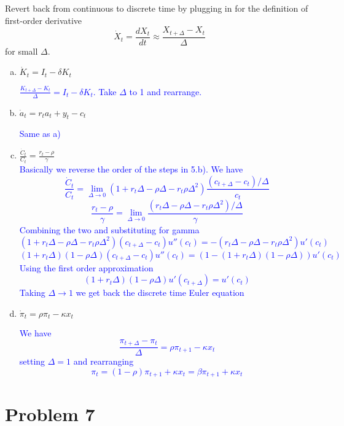 \documentclass[11pt]{extarticle}
\theoremstyle{plain}
\theoremstyle{definition}
\begin{document}
Revert back from continuous to discrete time by plugging in for the definition of first-order derivative
\begin{equation*}
	\dot X_t = \frac{dX_t}{dt} \approx \frac{X_{t+\Delta} - X_t}{\Delta}
\end{equation*}
for small $\Delta$. 

\begin{enumerate}[(a)]
\item $\dot K_t = I_t - \delta K_t$

\textcolor{blue}{$\frac{K_{t+\Delta}-K_t}{\Delta}=I_t-\delta K_t$. Take $\Delta$ to 1 and rearrange.}


\item $\dot a_t = r_t a_t + y_t - c_t$

\textcolor{blue}{Same as a)}

\item $\frac{\dot C_t}{C_t} = \frac{r_t - \rho}{\gamma}$ \\

\textcolor{blue}{Basically we reverse the order of the steps in 5.b). We have $$ \frac{\dot C_t}{C_t} = \lim_{\Delta \rightarrow 0} (1+r_t \Delta-\rho \Delta - r_t \rho \Delta^2) \frac{(c_{t+\Delta}-c_t)/\Delta}{c_t} $$ $$ \frac{r_t - \rho}{\gamma}  =  \lim_{\Delta \rightarrow 0}  \frac{(r_t \Delta-\rho \Delta - r_t \rho \Delta^2)/\Delta}{\gamma} $$ Combining the two and substituting for gamma $$ (1+r_t \Delta-\rho \Delta - r_t \rho \Delta^2) (c_{t+\Delta}-c_t)u''(c_{t}) = - (r_t \Delta-\rho \Delta - r_t \rho \Delta^2) u'(c_t)$$ $$(1+r_t \Delta)(1-\rho \Delta) (c_{t+\Delta}-c_t)u''(c_{t})=(1-(1+r_t \Delta)(1-\rho \Delta))u'(c_t) $$ Using the first order approximation $$(1+r_t \Delta)(1-\rho \Delta) u'(c_{t+\Delta})=u'(c_t)$$ Taking $\Delta \rightarrow 1$ we get back the discrete time Euler equation}

\item $\dot \pi_t = \rho \pi_t - \kappa x_t$

\textcolor{blue}{We have $$\frac{\pi_{t+\Delta}-\pi_t}{\Delta}=\rho \pi_{t+1}-\kappa x_t$$ setting $\Delta = 1$ and rearranging $$\pi_t = (1-\rho)\pi_{t+1}+\kappa x_t = \beta \pi_{t+1}+\kappa x_t$$}
\end{enumerate}



\vspace{10mm}
\section*{Problem 7}
\end{document}
